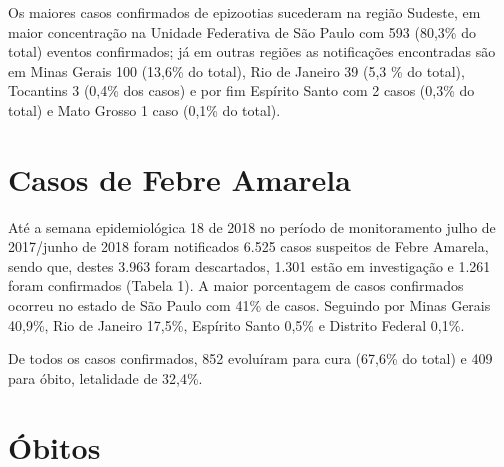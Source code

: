 \documentclass{article}
\begin{document}
\begin{multicols*}{2}
{	Os maiores casos confirmados de epizootias sucederam na região Sudeste, em maior concentração na Unidade Federativa de São Paulo com 593 (80,3\% do total) eventos confirmados; já em outras regiões as notificações encontradas são em Minas Gerais 100 (13,6\% do total), Rio de Janeiro 39 (5,3 \% do total), Tocantins 3 (0,4\% dos casos) e por fim Espírito Santo com 2 casos (0,3\% do total)  e Mato Grosso 1 caso (0,1\% do total).

}%






\section*{Casos de Febre Amarela} %

	{\large %
    
    
    Até a semana epidemiológica 18 de 2018 no período de monitoramento julho de 2017/junho de 2018 foram notificados 6.525 casos suspeitos de Febre Amarela, sendo que, destes 3.963 foram descartados, 1.301 estão em investigação e 1.261 foram confirmados (Tabela 1). A maior porcentagem de casos confirmados ocorreu no estado de São Paulo com 41\% de casos. Seguindo por Minas Gerais 40,9\%, Rio de Janeiro 17,5\%, Espírito Santo 0,5\% e Distrito Federal 0,1\%.
    
	De todos os casos confirmados, 852 evoluíram para cura (67,6\% do total) e 409 para óbito, letalidade de 32,4\%.
}%



\section*{Óbitos}%


\end{multicols*}
\end{document}
